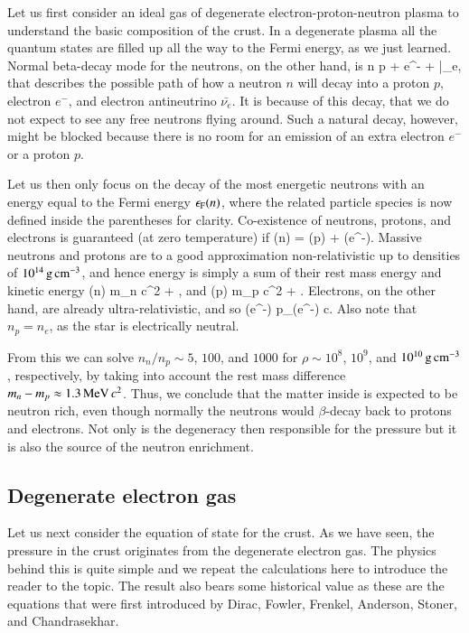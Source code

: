 Let us first consider an ideal gas of degenerate electron-proton-neutron plasma to understand the basic composition of the crust.\cite[see e.g.,][]{Phillips94}
In a degenerate plasma all the quantum states are filled up all the way to the Fermi energy, as we just learned.
Normal beta-decay mode for the neutrons, on the other hand, is 
\be
n \rightarrow p + e^{-} + \bar{\nu_{e}},
\ee
that describes the possible path of how a neutron $n$ will decay into a proton $p$, electron $e^{-}$, and electron antineutrino $\bar{\nu_{e}}$.
It is because of this decay, that we do not expect to see any free neutrons flying around.
Such a natural decay, however, might be blocked because there is no room for an emission of an extra electron $e^{-}$ or a proton $p$.

Let us then only focus on the decay of the most energetic neutrons with an energy equal to the Fermi energy $\epsilon_{\mathrm{F}} (n)$, where the related particle species is now defined inside the parentheses for clarity.
Co-existence of neutrons, protons, and electrons is guaranteed (at zero temperature) if 
\be
\ef(n) = \ef(p) + \ef(e^{-}).
\ee
Massive neutrons and protons are to a good approximation non-relativistic up to densities of $10^{14}\, \mathrm{g}\,\mathrm{cm}^{-3}$, and hence energy is simply a sum of their rest mass energy and kinetic energy
\be
\ef(n) \approx m_n c^2 + ,
\ee
and
\be
\ef(p) \approx m_p c^2 + .
\ee
Electrons, on the other hand, are already ultra-relativistic, and so
\be
\ef(e^{-}) \approx p_{}(e^{-}) c.
\ee
Also note that $n_p = n_e$, as the star is electrically neutral.

From this we can solve $n_n/n_p \sim 5$, $100$, and $1000$ for $\rho \sim 10^8$, $10^9$, and $10^{10} \, \mathrm{g}\,\mathrm{cm}^{-3}$, respectively, by taking into account the rest mass difference $m_n - m_p \approx 1.3 \,\mathrm{MeV}\, c^2$.
Thus, we conclude that the matter inside is expected to be neutron rich, even though normally the neutrons would $\beta$-decay back to protons and electrons.
Not only is the degeneracy then responsible for the pressure but it is also the source of the neutron enrichment. 


\subsection{Degenerate electron gas}
Let us next consider the equation of state for the crust.
As we have seen, the pressure in the crust originates from the degenerate electron gas.
The physics behind this is quite simple and we repeat the calculations here to introduce the reader to the topic.
The result also bears some historical value as these are the equations that were first introduced by Dirac\cite{Dirac25}, Fowler\cite{Fowler26}, Frenkel\cite{Frenkel28}, Anderson\cite{Anderson29}, Stoner\cite{Stoner30}, and Chandrasekhar\cite{Cha31}.\cite[see also][]{Cha39, Schatzman58, Salpeter61, Tooper69, ZN71, LL80, Blinnikov87, YS89, HPY07}

